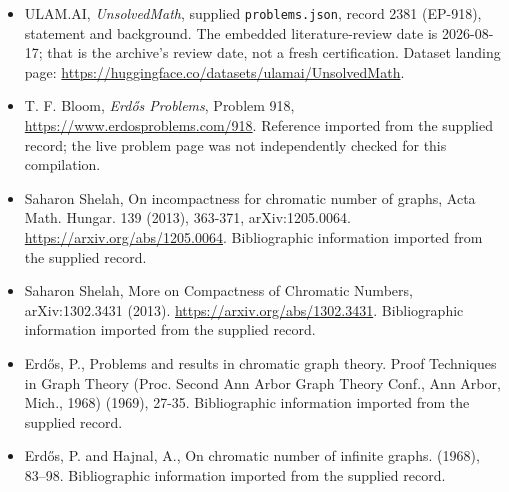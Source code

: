 \documentclass[11pt,a4paper]{article}
\begin{document}
{\small

\begin{itemize}

\item[\hypertarget{source:2381:1}{S1}] ULAM.AI, \emph{UnsolvedMath}, supplied \texttt{problems.json}, record 2381 (EP-918), statement and background. The embedded literature-review date is 2026-08-17; that is the archive’s review date, not a fresh certification. Dataset landing page: \url{https://huggingface.co/datasets/ulamai/UnsolvedMath}.

\item[\hypertarget{source:2381:2}{S2}] T. F. Bloom, \emph{Erdős Problems}, Problem 918, \url{https://www.erdosproblems.com/918}. Reference imported from the supplied record; the live problem page was not independently checked for this compilation.

\item[\hypertarget{source:2381:3}{S3}] Saharon Shelah, On incompactness for chromatic number of graphs, Acta Math. Hungar. 139 (2013), 363-371, arXiv:1205.0064. \url{https://arxiv.org/abs/1205.0064}. Bibliographic information imported from the supplied record.

\item[\hypertarget{source:2381:4}{S4}] Saharon Shelah, More on Compactness of Chromatic Numbers, arXiv:1302.3431 (2013). \url{https://arxiv.org/abs/1302.3431}. Bibliographic information imported from the supplied record.

\item[\hypertarget{source:2381:5}{S5}] Erd\H{o}s, P., Problems and results in chromatic graph theory. Proof Techniques in Graph Theory (Proc. Second Ann Arbor Graph Theory Conf., Ann Arbor, Mich., 1968) (1969), 27-35. Bibliographic information imported from the supplied record.

\item[\hypertarget{source:2381:6}{S6}] Erd\H{o}s, P. and Hajnal, A., On chromatic number of infinite graphs. (1968), 83--98. Bibliographic information imported from the supplied record.

\end{itemize}

}

\label{end:2381}
\end{document}
